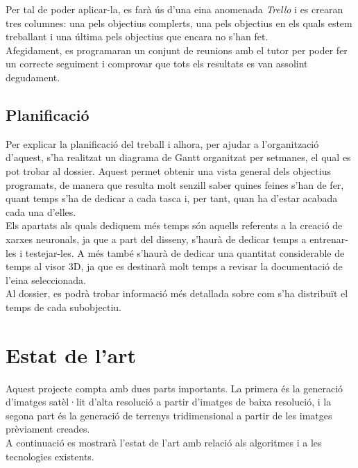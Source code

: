 ﻿\documentclass[10pt,a4paper,twocolumn,twoside]{article}
\begin{document}
Per tal de poder aplicar-la, es farà ús d'una eina anomenada \textit{Trello} \cite{trello} i es crearan tres columnes: una pels objectius complerts, una pels objectius en els quals estem treballant i una última pels objectius que encara no s'han fet.\\

Afegidament, es programaran un conjunt de reunions amb el tutor per poder fer un correcte seguiment i comprovar que tots els resultats es van assolint degudament.

\subsection{Planificació}

Per explicar la planificació del treball i alhora, per ajudar a l'organització d'aquest, s'ha realitzat un diagrama de Gantt organitzat per setmanes, el qual es pot trobar al dossier.
Aquest permet obtenir una vista general dels objectius programats, de manera que resulta molt senzill saber quines feines s'han de fer, quant temps s'ha de dedicar a cada tasca i, per tant, quan ha d'estar acabada cada una d'elles.\\


Els apartats als quals dediquem més temps són aquells referents a la creació de xarxes neuronals, ja que a part del disseny, s'haurà de dedicar temps a entrenar-les i testejar-les. A més també s'haurà de dedicar una quantitat considerable de temps al visor 3D, ja que es destinarà molt temps a revisar la documentació de l'eina seleccionada.\\
Al dossier, es podrà trobar informació més detallada sobre com s'ha distribuït el temps de cada subobjectiu.

\section{Estat de l'art}
Aquest projecte compta amb dues parts importants. La primera és la generació d'imatges satèl·lit d'alta resolució a partir d'imatges de baixa resolució, i la segona part és la generació de terrenys tridimensional a partir de les imatges prèviament creades.\\

A continuació es mostrarà l'estat de l'art amb relació als algoritmes i a les tecnologies existents.
\end{document}
